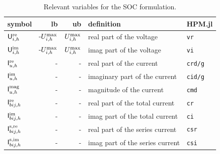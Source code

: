 \documentclass[journal]{IEEEtran}
\begin{document}
\begin{table}[H]
    \centering
    \caption{Relevant variables for the SOC formulation.}
    \label{tab:variables_nlp}
    \begin{tabular}{l r r l l }
        symbol                                                  & lb                                    & ub                                        & definition                                & HPM.jl            \\ \hline
        $\mathsf{U}^{\text{re}}_{i,h}$                        & -$U^{\text{max}}_{i,h}$   & $U^{\text{max}}_{i,h}$      & real part of the voltage                  & \texttt{vr}       \\
        $\mathsf{U}^{\text{im}}_{i,h}$                   & -$U^{\text{max}}_{i,h}$   & $U^{\text{max}}_{i,h}$      & imag part of the voltage                  & \texttt{vi}       \\ \hline
        $\mathsf{I}^{\text{re}}_{u,h}$                        & -                                     & -                                         & real part of the current                  & \texttt{crd/g}    \\ 
        $\mathsf{I}^{\text{im}}_{u,h}$                   & -                                     & -                                         & imaginary part of the current             & \texttt{cid/g}    \\ 
        $\mathsf{I}^{\text{mag}}_{u,h}$                   & -                                     & -                                         & magnitude of the current                  & \texttt{cmd}      \\ \hline
        $\mathsf{I}^{\text{re}}_{bij,h}$                   & -                                     & -                                         & real part of the total current            & \texttt{cr}       \\ 
        $\mathsf{I}^{\text{im}}_{bij,h}$              & -                                     & -                                         & imag part of the total current            & \texttt{ci}       \\ 
        $\mathsf{I}^{\text{s,re}}_{bij,h}$             & -                                     & -                                         & real part of the series current           & \texttt{csr}      \\ 
        $\mathsf{I}^{\text{s,im}}_{bij,h}$        & -                                     & -                                         & imag part of the series current           & \texttt{csi}      \\ \hline

\end{tabular}
\end{table}
\end{document}
